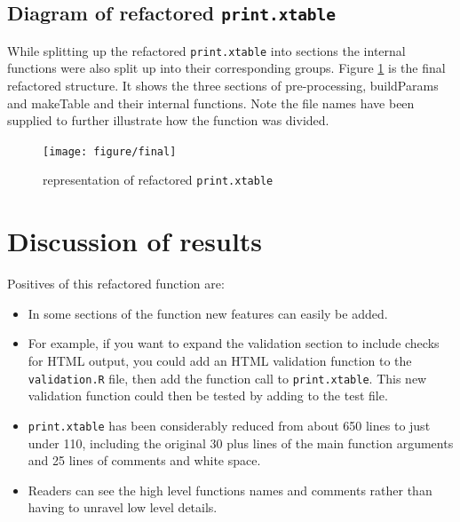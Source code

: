 \documentclass{memoir}\usepackage[]{graphicx}\usepackage[]{color}
\newenvironment{knitrout}{}{} %
\let\code=\texttt
\begin{document}
\subsection{Diagram of refactored \code{print.xtable}}

While splitting up the refactored \code{print.xtable} into sections the internal functions were also split up into their corresponding groups. Figure \ref{fig:final} is the final refactored structure. It shows the three sections of pre-processing, buildParams and makeTable and their internal functions. Note the file names have been supplied to further illustrate how the function was divided. 
\begin{figure}[H]
\begin{knitrout}
\color{fgcolor}
\texttt{[image: figure/final]} 

\end{knitrout}
\caption{representation of refactored \code{print.xtable}}\label{fig:final}
\end{figure}

\newpage
\section{Discussion of results}

Positives of this refactored function are:
\begin{itemize}
  \item In some sections of the function new features can easily be added.
  \item For example, if you want to expand the validation section to include checks for HTML output, you could add an HTML validation function to the \code{validation.R} file, then add the function call to \code{print.xtable}. This new validation function could then be tested by adding to the test file.
  \item \code{print.xtable} has been considerably reduced from about 650 lines to just under 110, including the original 30 plus  lines of the main function arguments and 25 lines of comments and white space.
  \item Readers can see the high level functions names and comments rather than having to unravel low level details.
\end{itemize}
\end{document}
